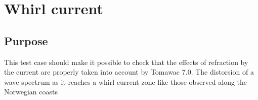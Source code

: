 \section{Whirl current}
%

%
\subsection{Purpose}
%
This test case should make it possible to check that the effects of refraction
by the current are properly taken into account by Tomawac 7.0. The distorsion
of a wave spectrum as it reaches a whirl current zone like those observed along
the Norwegian coasts \cite{Mathiesen1987}
%
